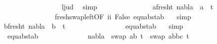 \begin{isabellebody}
\ \ \ \ \ \ \ \ \ \ \ \ \ \ \ \ \isamarkupfalse%
\ l{}{\isacharunderscore}{\kern0pt}jud\ \isamarkupfalse%
\ simp\isanewline
\isanewline
\ \ \ \ \ \ \ \ \ \ \ \ \isamarkupfalse%
\ \isamarkupfalse%
\ a{\isacharunderscore}{\kern0pt}fresh{\isacharunderscore}{\kern0pt}t{}{\isacharcolon}{\kern0pt}\ {\isachardoublequoteopen}nabla\ {\isasymturnstile}\ a\ {\isasymsharp}\ t{}{\isacharprime}{\kern0pt}{\isachardoublequoteclose}\isanewline
\ \ \ \ \ \ \ \ \ \ \ \ \ \ \isamarkupfalse%
\ fresh{\isacharunderscore}{\kern0pt}swap{\isacharunderscore}{\kern0pt}left{\isacharbrackleft}{\kern0pt}OF\ ii{\isacharbrackright}{\kern0pt}\ False\ equ{\isacharunderscore}{\kern0pt}abst{\isacharunderscore}{\kern0pt}ab\ {}\ \isamarkupfalse%
\ simp\isanewline
\ \ \ \ \ \ \ \ \ \ \ \ \isamarkupfalse%
\ b{\isacharunderscore}{\kern0pt}fresh{\isacharunderscore}{\kern0pt}t{}{\isacharcolon}{\kern0pt}\ {\isachardoublequoteopen}nabla\ {\isasymturnstile}\ b\ {\isasymsharp}\ t{}{\isacharprime}{\kern0pt}{\isachardoublequoteclose}\ \isanewline
\ \ \ \ \ \ \ \ \ \ \ \ \ \ \isamarkupfalse%
\ equ{\isacharunderscore}{\kern0pt}abst{\isacharunderscore}{\kern0pt}ab{\isacharparenleft}{\kern0pt}{}{\isacharparenright}{\kern0pt}\ {}{\isacharparenleft}{\kern0pt}{}{\isacharparenright}{\kern0pt}\ \isamarkupfalse%
\ simp\isanewline
\isanewline
\ \ \ \ \ \ \ \ \ \ \ \ \isamarkupfalse%
\ {}{\isacharparenleft}{\kern0pt}{}{\isacharparenright}{\kern0pt}\ equ{\isacharunderscore}{\kern0pt}abst{\isacharunderscore}{\kern0pt}ab{\isacharparenleft}{\kern0pt}{}{\isacharparenright}{\kern0pt}\isanewline
\ \ \ \ \ \ \ \ \ \ \ \ \isamarkupfalse%
\ {\isachardoublequoteopen}nabla\ {\isasymturnstile}\ swap\ {\isacharbrackleft}{\kern0pt}{\isacharparenleft}{\kern0pt}a{\isacharcomma}{\kern0pt}b{\isacharparenright}{\kern0pt}{\isacharbrackright}{\kern0pt}\ t{}{\isacharprime}{\kern0pt}\ {\isasymapprox}\ swap\ {\isacharparenleft}{\kern0pt}{\isacharbrackleft}{\kern0pt}{\isacharparenleft}{\kern0pt}a{\isacharcomma}{\kern0pt}b{\isacharparenright}{\kern0pt}{\isacharbrackright}{\kern0pt}{\isacharat}{\kern0pt}{\isacharbrackleft}{\kern0pt}{\isacharparenleft}{\kern0pt}b{\isacharcomma}{\kern0pt}c{\isacharparenright}{\kern0pt}{\isacharbrackright}{\kern0pt}{\isacharparenright}{\kern0pt}\ t{}{\isacharprime}{\kern0pt}{\isachardoublequoteclose}\isanewline

\end{isabellebody}
